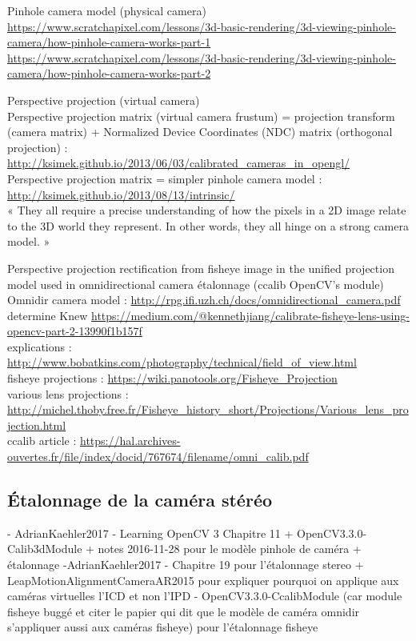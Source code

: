 Pinhole camera model (physical camera)\\
\url{https://www.scratchapixel.com/lessons/3d-basic-rendering/3d-viewing-pinhole-camera/how-pinhole-camera-works-part-1}\\
\url{https://www.scratchapixel.com/lessons/3d-basic-rendering/3d-viewing-pinhole-camera/how-pinhole-camera-works-part-2}

Perspective projection (virtual camera)\\
Perspective projection matrix (virtual camera frustum) = projection transform (camera matrix) + Normalized Device Coordinates (NDC) matrix (orthogonal projection) : \url{http://ksimek.github.io/2013/06/03/calibrated_cameras_in_opengl/}\\
Perspective projection matrix = simpler pinhole camera model : \url{http://ksimek.github.io/2013/08/13/intrinsic/}\\
« They all require a precise understanding of how the pixels in a 2D image relate to the 3D world they represent. In other words, they all hinge on a strong camera model. »

Perspective projection rectification from fisheye image in the unified projection model used in omnidirectional camera étalonnage (ccalib OpenCV's module)\\
Omnidir camera model : \url{http://rpg.ifi.uzh.ch/docs/omnidirectional_camera.pdf}\\
determine Knew \url{https://medium.com/@kennethjiang/calibrate-fisheye-lens-using-opencv-part-2-13990f1b157f}\\
explications : \url{http://www.bobatkins.com/photography/technical/field_of_view.html}\\
fisheye projections : \url{https://wiki.panotools.org/Fisheye_Projection}\\
various lens projections : \url{http://michel.thoby.free.fr/Fisheye_history_short/Projections/Various_lens_projection.html}\\
ccalib article : \url{https://hal.archives-ouvertes.fr/file/index/docid/767674/filename/omni_calib.pdf}


\subsection{Étalonnage de la caméra stéréo}

- AdrianKaehler2017 - Learning OpenCV 3 Chapitre 11 + OpenCV3.3.0-Calib3dModule + notes 2016-11-28 pour le modèle pinhole de caméra + étalonnage
-AdrianKaehler2017 -  Chapitre 19 pour l'étalonnage stereo + LeapMotionAlignmentCameraAR2015 pour expliquer pourquoi on applique aux caméras virtuelles l'ICD et non l'IPD
- OpenCV3.3.0-CcalibModule (car module fisheye buggé et citer le papier qui dit que le modèle de caméra omnidir s'appliquer aussi aux caméras fisheye) pour l'étalonnage fisheye

